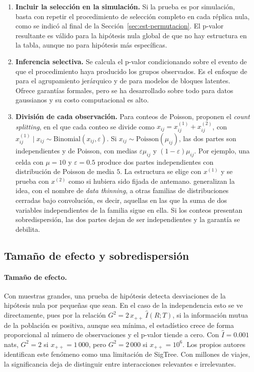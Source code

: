 \begin{enumerate}
  \item \textbf{Incluir la selección en la simulación.} Si la prueba es por
  simulación, basta con repetir el procedimiento de selección completo en cada
  réplica nula, como se indicó al final de la Sección~\ref{sec:est-permutacion}.
  El p-valor resultante es válido para la hipótesis nula global de que no hay
  estructura en la tabla, aunque no para hipótesis más específicas.
  \item \textbf{Inferencia selectiva.} Se calcula el p-valor condicionando sobre
  el evento de que el procedimiento haya producido los grupos observados. Es el
  enfoque de \citet{Gao2024} para el agrupamiento jerárquico y de
  \citet{Watanabe2021si} para modelos de bloques latentes. Ofrece garantías
  formales, pero se ha desarrollado sobre todo para datos gaussianos y su costo
  computacional es alto.
  \item \textbf{División de cada observación.} Para conteos de Poisson,
  \citet{Neufeld2024cs} proponen el \emph{count splitting}, en el que cada conteo se divide
  como $x_{ij} = x^{(1)}_{ij} + x^{(2)}_{ij}$, con $x^{(1)}_{ij} \mid x_{ij} \sim
  \mathrm{Binomial}(x_{ij}, \varepsilon)$. Si $x_{ij} \sim
  \mathrm{Poisson}(\mu_{ij})$, las dos partes son independientes y de Poisson, con
  medias $\varepsilon\mu_{ij}$ y $(1-\varepsilon)\mu_{ij}$. Por ejemplo, una celda con $\mu = 10$ y $\varepsilon = 0.5$ produce dos partes independientes con distribución de Poisson de media $5$. La estructura se
  elige con $x^{(1)}$ y se prueba con $x^{(2)}$ como si hubiera sido fijada de
  antemano. \citet{Neufeld2024dt} generalizan la idea, con el nombre de
  \emph{data thinning}, a otras familias de distribuciones cerradas bajo convolución, es decir, aquellas en las que la suma de dos variables independientes de la familia sigue en ella. Si los conteos presentan sobredispersión, las dos partes dejan de
  ser independientes y la garantía se debilita.
\end{enumerate}

\subsection{Tamaño de efecto y sobredispersión}\label{sec:est-efecto}

\paragraph{Tamaño de efecto.} Con muestras grandes, una prueba de hipótesis
detecta desviaciones de la hipótesis nula por pequeñas que sean. En el caso de la
independencia esto se ve directamente, pues por la relación $G^2 = 2\,x_{++}\,\hat
I(R;T)$, si la información mutua de la población es positiva, aunque sea
mínima, el estadístico crece de forma proporcional al número de observaciones y
el p-valor tiende a cero. Con $\hat I = 0.001$ nats, $G^2 = 2$ si $x_{++} = 1\,000$, pero $G^2 = 2\,000$ si $x_{++} = 10^6$. Los propios autores \citep[Sec.~5]{Hu2025} identifican este
fenómeno como una limitación de SigTree. Con millones de viajes, la
significancia deja de distinguir entre interacciones relevantes e irrelevantes.

